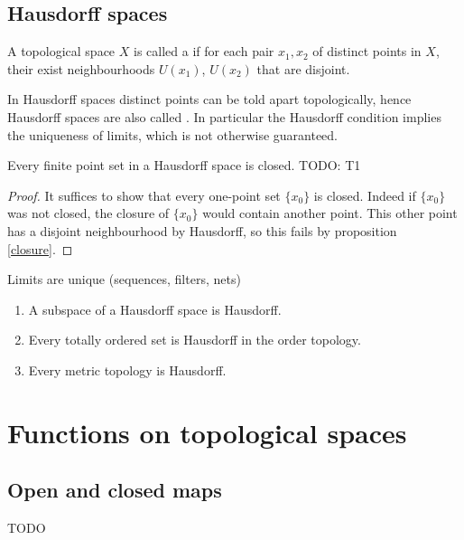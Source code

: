 \subsection{Hausdorff spaces}
\begin{definition}
A topological space $X$ is called a  if for each pair $x_1, x_2$ of distinct points in $X$, their exist neighbourhoods $U(x_1)$, $U(x_2)$ that are disjoint.
\end{definition}
In Hausdorff spaces distinct points can be told apart topologically, hence Hausdorff spaces are also called . In particular the Hausdorff condition implies the uniqueness of limits, which is not otherwise guaranteed.

\begin{proposition}
Every finite point set in a Hausdorff space is closed. TODO: T1
\end{proposition}
\begin{proof}
It suffices to show that every one-point set $\{x_0\}$ is closed. Indeed if $\{x_0\}$ was not closed, the closure of $\{x_0\}$ would contain another point. This other point has a disjoint neighbourhood by Hausdorff, so this fails by proposition \ref{closure}.
\end{proof}
\begin{proposition}
Limits are unique (sequences, filters, nets)
\end{proposition}
\begin{lemma}
\begin{enumerate}
\item A subspace of a Hausdorff space is Hausdorff.
\item Every totally ordered set is Hausdorff in the order topology.
\item Every metric topology is Hausdorff.
\end{enumerate}
\end{lemma}



\section{Functions on topological spaces}
\subsection{Open and closed maps}
TODO
